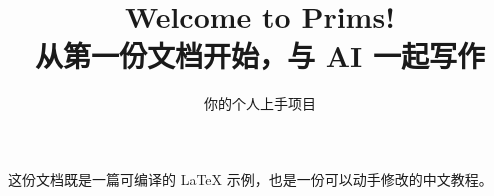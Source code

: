 \documentclass[UTF8,fontset=fandol,11pt,a4paper]{ctexart}
\title{\textbf{Welcome to Prims!}\\[0.4em]\large 从第一份文档开始，与 AI 一起写作}
\author{你的个人上手项目}
\date{}
\begin{document}
\maketitle
\begin{center}
\small 这份文档既是一篇可编译的 LaTeX 示例，也是一份可以动手修改的中文教程。
\end{center}
\tableofcontents





\end{document}

